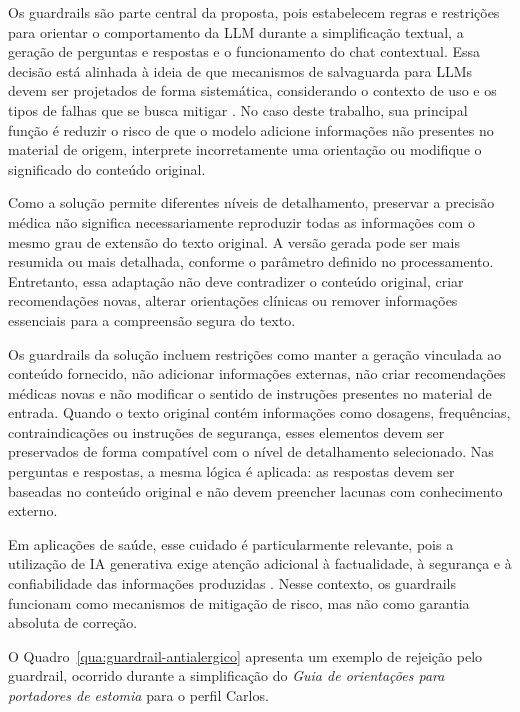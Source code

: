 Os guardrails são parte central da proposta, pois estabelecem regras e restrições para orientar o comportamento da LLM durante a simplificação textual, a geração de perguntas e respostas e o funcionamento do chat contextual. Essa decisão está alinhada à ideia de que mecanismos de salvaguarda para LLMs devem ser projetados de forma sistemática, considerando o contexto de uso e os tipos de falhas que se busca mitigar \cite{dong2024guardrails}. No caso deste trabalho, sua principal função é reduzir o risco de que o modelo adicione informações não presentes no material de origem, interprete incorretamente uma orientação ou modifique o significado do conteúdo original.

Como a solução permite diferentes níveis de detalhamento, preservar a precisão médica não significa necessariamente reproduzir todas as informações com o mesmo grau de extensão do texto original. A versão gerada pode ser mais resumida ou mais detalhada, conforme o parâmetro definido no processamento. Entretanto, essa adaptação não deve contradizer o conteúdo original, criar recomendações novas, alterar orientações clínicas ou remover informações essenciais para a compreensão segura do texto. 

Os guardrails da solução incluem restrições como manter a geração vinculada ao conteúdo fornecido, não adicionar informações externas, não criar recomendações médicas novas e não modificar o sentido de instruções presentes no material de entrada. Quando o texto original contém informações como dosagens, frequências, contraindicações ou instruções de segurança, esses elementos devem ser preservados de forma compatível com o nível de detalhamento selecionado. Nas perguntas e respostas, a mesma lógica é aplicada: as respostas devem ser baseadas no conteúdo original e não devem preencher lacunas com conhecimento externo. 

Em aplicações de saúde, esse cuidado é particularmente relevante, pois a utilização de IA generativa exige atenção adicional à factualidade, à segurança e à confiabilidade das informações produzidas \cite{gangavarapu2024healthcare}. Nesse contexto, os guardrails funcionam como mecanismos de mitigação de risco, mas não como garantia absoluta de correção.

O Quadro~\ref{qua:guardrail-antialergico} apresenta um exemplo de rejeição pelo guardrail, ocorrido durante a simplificação do \textit{Guia de orientações para portadores de estomia} para o perfil Carlos.

